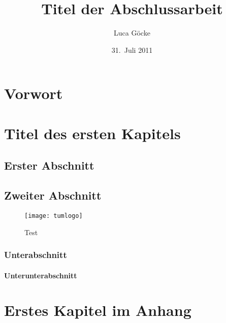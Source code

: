 \documentclass[encoding=utf8,british]{tumphthesis}
\title{Titel der Abschlussarbeit}
\author{Luca Göcke}
\date{31.~Juli 2011}
\begin{document}

\frontmatter
\maketitle
\tableofcontents

\chapter{Vorwort}

\mainmatter
\chapter{Titel des ersten Kapitels}
\section{Erster Abschnitt}


\section{Zweiter Abschnitt}
\begin{figure}
	\centering
	\texttt{[image: tumlogo]}
	\caption{\label{fig:test}Test}
\end{figure}
\subsection{Unterabschnitt}
\subsubsection{Unterunterabschnitt}

\appendix
\chapter{Erstes Kapitel im Anhang}

\backmatter
\printbibliography
\end{document}
